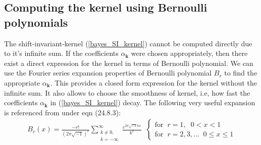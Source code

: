 \documentclass[smallextended]{svjour3}       %
\newcommand{\bm}[1]{\boldsymbol{#1}}
\newcommand{\vk}{\bm{k}}
\begin{document}
\subsection{Computing the kernel using Bernoulli polynomials}
The shift-invariant-kernel (\ref{bayes_SI_kernel}) cannot be computed directly due to it's  infinite sum. 
If the coefficients $\alpha_{\vk}$ were chosen appropriately, then there exist a direct expression for the kernel in terms of Bernoulli polynomial. 
We can use the Fourier series expansion properties \cite{DLMF} of Bernoulli polynomial $B_r$ to find the appropriate $\alpha_{\vk}$. This provides a closed form expression for the kernel without the infinite sum. It also allows to choose the smoothness of kernel, i.e, how fast the coefficients $\alpha_{\vk}$ in (\ref{bayes_SI_kernel}) decay.
The following very useful expansion is referenced from \cite{DLMF} under eqn (24.8.3):
\begin{align}
\label{dlmf_bernoulli_24_8_3}
B_{r}(x) = \frac{-r!}{(2 \pi \sqrt{-1})^{r}} 
\sum_{\substack{k \neq 0,\\ k=-\infty}}^\infty 
\frac{e^{2\pi\sqrt{-1} k x}}{k^{r}}
\;\;
\begin{cases}
\text{for} \;\; r=1, \;\; 0 < x < 1 \\
\text{for} \;\; r=2,3,\hdots \;\; 0 \leq x \leq 1
\end{cases}
\end{align}
\end{document}

